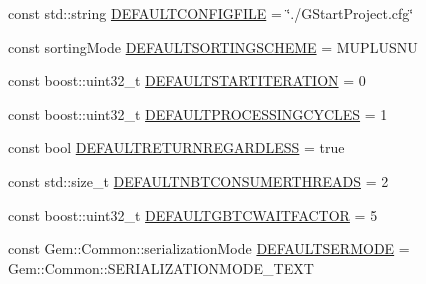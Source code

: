 \begin{DoxyCompactItemize}
\item 
const std::string \hyperlink{namespaceGem_1_1Geneva_aaba4e2cd93c01787464ebd89699a0259}{DEFAULTCONFIGFILE} = \char`\"{}./GStartProject.cfg\char`\"{}
\item 
const sortingMode \hyperlink{namespaceGem_1_1Geneva_ae75bab36ebf398bfef62bc0432280980}{DEFAULTSORTINGSCHEME} = MUPLUSNU
\item 
const boost::uint32\_\-t \hyperlink{namespaceGem_1_1Geneva_a1295783da2a3d26bd95ee66a2b1e0e28}{DEFAULTSTARTITERATION} = 0
\item 
const boost::uint32\_\-t \hyperlink{namespaceGem_1_1Geneva_a6c15979db3e3fb1efa968e5444296b01}{DEFAULTPROCESSINGCYCLES} = 1
\item 
const bool \hyperlink{namespaceGem_1_1Geneva_aa28d6ada86d874ce11bde88b5569a34d}{DEFAULTRETURNREGARDLESS} = true
\item 
const std::size\_\-t \hyperlink{namespaceGem_1_1Geneva_ac381bed98f84863017b49a4c155199fe}{DEFAULTNBTCONSUMERTHREADS} = 2
\item 
const boost::uint32\_\-t \hyperlink{namespaceGem_1_1Geneva_a1a77f7000b4cb6095f973fc2d0571ff9}{DEFAULTGBTCWAITFACTOR} = 5
\item 
const Gem::Common::serializationMode \hyperlink{namespaceGem_1_1Geneva_abffd76330c5d5bbb1808dd71a3241944}{DEFAULTSERMODE} = Gem::Common::SERIALIZATIONMODE\_\-TEXT
\end{DoxyCompactItemize}



